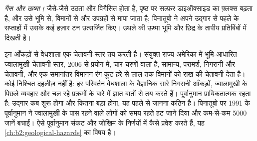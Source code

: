 \begin{omfigure}
\centering
{}
\par{}
\end{omfigure}

\emph{गैस और ऊष्मा।} जैसे-जैसे  उठता और विगैसित होता है, पृष्ठ पर सल्फ़र डाइऑक्साइड का
फ़्लक्स बढ़ता है, और उसे भूमि से, विमानों से और
उपग्रहों से मापा जाता है; पिनातूबो ने अपने उद्गार से पहले के सप्ताहों में उसके कई हज़ार टन उत्सर्जित किए।
उथले  की ऊष्मा भूमि और छिद्र के तापीय प्रतिबिंबों में दिखती है।

इन आँकड़ों से वेधशाला एक चेतावनी-स्तर तय करती है। संयुक्त राज्य अमेरिका में
भूमि-आधारित ज्वालामुखी चेतावनी स्तर, 2006 से प्रयोग में, चार चरणों वाला है, सामान्य,
परामर्श, निगरानी और चेतावनी, और एक समानांतर विमानन रंग कूट हरे से लाल तक
विमानों को राख की चेतावनी देता है। कोई निश्चित दहलीज़ नहीं है: हर परिवर्तन
वेधशाला के वैज्ञानिक सारे निगरानी आँकड़ों, ज्वालामुखी के पिछले
व्यवहार और चल रहे प्रक्रमों के बारे में ज्ञात बातों से तय करते हैं। पूर्वानुमान
प्रायिकतात्मक रहता है: उद्गार कब शुरू होगा और कितना बड़ा होगा, यह
पहले से जानना कठिन है। पिनातूबो पर 1991 के पूर्वानुमान ने ज्वालामुखी के पास रहने वाले
लोगों को समय रहते हट जाने दिया और कम-से-कम \num{5000} जानें बचाईं। ऐसे पूर्वानुमान
संकट और जोखिम के निर्णयों में कैसे प्रवेश करते हैं, यह \cref{ch:b2:geological-hazards} का विषय है।

